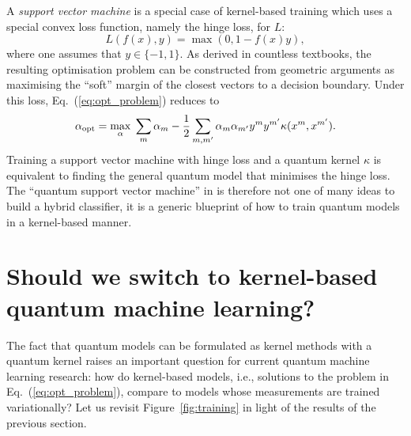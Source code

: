 \documentclass[aps, reprint, onecolumn, nofootinbib, longbibliography]{revtex4-2}
\begin{document}
A \textit{support vector machine} is a special case of kernel-based training which uses a special convex loss function, namely the hinge loss, for $L$: 
\begin{equation}
    L(f(x), y) = \max(0, 1- f(x)y),
\end{equation}
where one assumes that $y \in \{-1, 1\}$. As derived in countless textbooks, the resulting optimisation problem can be constructed from geometric arguments as maximising the ``soft'' margin of the closest vectors to a decision boundary. Under this loss, Eq.~(\ref{eq:opt_problem}) reduces to
\begin{equation}\label{eq:alphas}
    \mathbf{\alpha}_{\rm opt} = \max_{\mathbf{\alpha}}  \; \sum_m \alpha_m - \frac{1}{2} \sum_{m, m'} \alpha_{m} \alpha_{m'} y^m y^{m'} \kappa(x^{m}, x^{m'}).
\end{equation}
Training a support vector machine with hinge loss and a quantum kernel $\kappa$ is equivalent to finding the general quantum model that minimises the hinge loss. The ``quantum support vector machine'' in \citep{schuld2019quantum, havlivcek2019supervised} is therefore not one of many ideas to build a hybrid classifier, it is a generic blueprint of how to train quantum models in a kernel-based manner. 

\section{Should we switch to kernel-based quantum machine learning?}

The fact that quantum models can be formulated as kernel methods with a quantum kernel raises an important question for current quantum machine learning research: how do kernel-based models, i.e., solutions to the problem in Eq.~(\ref{eq:opt_problem}), compare to models whose measurements are trained variationally? Let us revisit Figure~\ref{fig:training} in light of the results of the previous section. 
\end{document}
